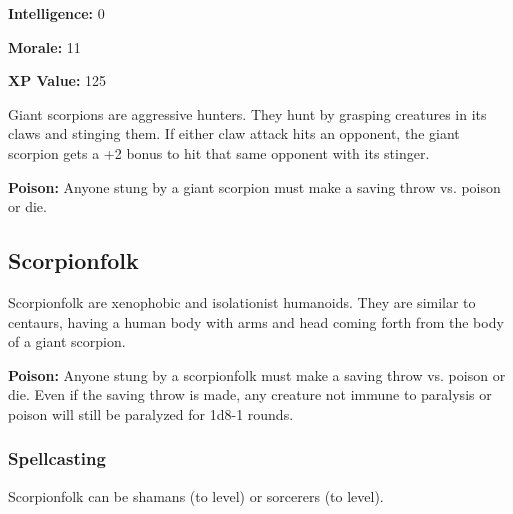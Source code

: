 \begin{multicols*}{2}
{\textbf{Intelligence:} 0

\textbf{Morale:} 11

\textbf{XP Value:} 125}

Giant scorpions are aggressive hunters. They hunt by grasping creatures in its claws and stinging them. If either claw attack hits an opponent, the giant scorpion gets a +2 bonus to hit that same opponent with its stinger.

\textbf{Poison:} Anyone stung by a giant scorpion must make a saving throw vs. poison or die.

\subsection{Scorpionfolk}

Scorpionfolk are xenophobic and isolationist humanoids. They are similar to centaurs, having a human body with arms and head coming forth from the body of a giant scorpion.

\textbf{Poison:} Anyone stung by a scorpionfolk must make a saving throw vs. poison or die. Even if the saving throw is made, any creature not immune to paralysis or poison will still be paralyzed for 1d8-1 rounds.

\subsubsection{Spellcasting}
Scorpionfolk can be shamans (to  level) or sorcerers (to  level).


\end{multicols*}
